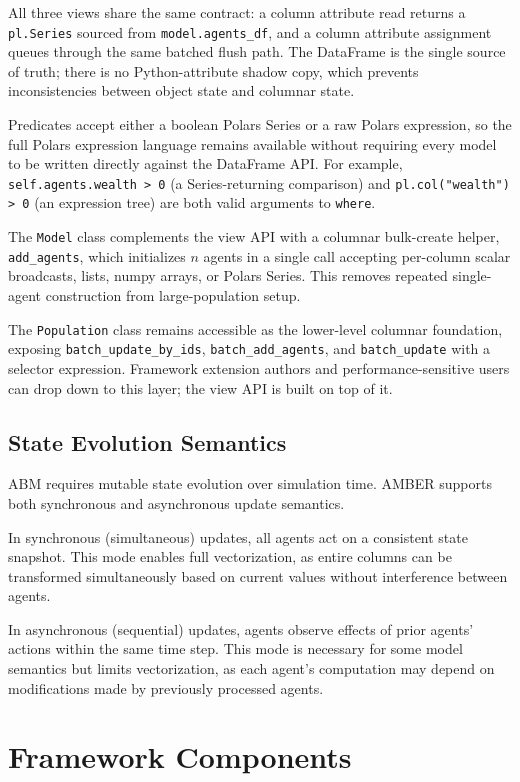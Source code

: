 \documentclass[11pt,a4paper]{article}
\begin{document}
All three views share the same contract: a column attribute read returns a \texttt{pl.Series} sourced from \texttt{model.agents\_df}, and a column attribute assignment queues through the same batched flush path. The DataFrame is the single source of truth; there is no Python-attribute shadow copy, which prevents inconsistencies between object state and columnar state.

Predicates accept either a boolean Polars Series or a raw Polars expression, so the full Polars expression language remains available without requiring every model to be written directly against the DataFrame API. For example, \texttt{self.agents.wealth > 0} (a Series-returning comparison) and \texttt{pl.col("wealth") > 0} (an expression tree) are both valid arguments to \texttt{where}.

The \texttt{Model} class complements the view API with a columnar bulk-create helper, \texttt{add\_agents}, which initializes $n$ agents in a single call accepting per-column scalar broadcasts, lists, numpy arrays, or Polars Series. This removes repeated single-agent construction from large-population setup.

The \texttt{Population} class remains accessible as the lower-level columnar foundation, exposing \texttt{batch\_update\_by\_ids}, \texttt{batch\_add\_agents}, and \texttt{batch\_update} with a selector expression. Framework extension authors and performance-sensitive users can drop down to this layer; the view API is built on top of it.

\subsection{State Evolution Semantics}

ABM requires mutable state evolution over simulation time. AMBER supports both synchronous and asynchronous update semantics.

In synchronous (simultaneous) updates, all agents act on a consistent state snapshot. This mode enables full vectorization, as entire columns can be transformed simultaneously based on current values without interference between agents.

In asynchronous (sequential) updates, agents observe effects of prior agents' actions within the same time step. This mode is necessary for some model semantics but limits vectorization, as each agent's computation may depend on modifications made by previously processed agents.

\section{Framework Components}
\label{sec:components}
\end{document}
